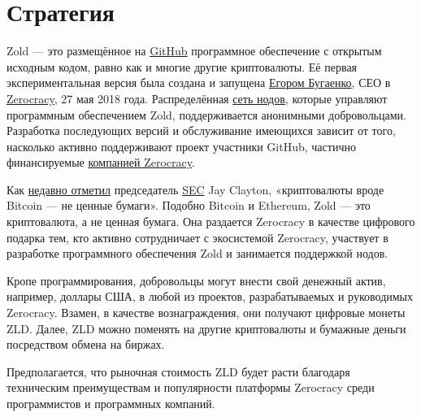 \documentclass[12pt,oneside]{article}
\begin{document}
\pagebreak

\section*{Стратегия}

Zold --- это размещённое на \href{https://github.com/zold-io}{GitHub} программное обеспечение с открытым исходным
кодом, равно как и многие другие криптовалюты. Её первая экспериментальная версия была
создана и запущена \href{https://www.yegor256.com}{Егором Бугаенко}, СЕО в \href{https://www.zerocracy.com}{Zerocracy}, 27 мая 2018 года.
Распределённая \href{http://www.zold.io/map.html}{сеть нодов}, которые управляют
программным обеспечением Zold, поддерживается анонимными
добровольцами. Разработка последующих версий и обслуживание имеющихся зависит от
того, насколько активно поддерживают проект участники GitHub, частично
финансируемые \href{https://www.zerocracy.com}{компанией Zerocracy}.

Как \href{https://www.cnbc.com/video/2018/06/06/sec-chairman-cryptocurrencies-like-bitcoin--not-securities.html}{недавно отметил}
председатель \href{https://www.sec.gov/}{SEC} Jay Clayton, «криптовалюты вроде Bitcoin ---
не ценные бумаги». Подобно Bitcoin и Ethereum, Zold --- это криптовалюта, а не
ценная бумага. Она раздается Zerocracy в качестве цифрового подарка тем, кто
активно сотрудничает с экосистемой Zerocracy, участвует в разработке программного обеспечения
Zold и занимается поддержкой нодов.

Кропе программирования, добровольцы могут внести свой денежный актив, например,
доллары США, в любой из проектов, разрабатываемых и руководимых Zerocracy.
Взамен, в качестве вознаграждения, они получают цифровые монеты ZLD. Далее, ZLD
можно поменять на другие криптовалюты и бумажные деньги посредством обмена на биржах.

Предполагается, что рыночная стоимость ZLD будет расти благодаря техническим
преимуществам и популярности платформы Zerocracy среди программистов и
программных компаний.
\end{document}
